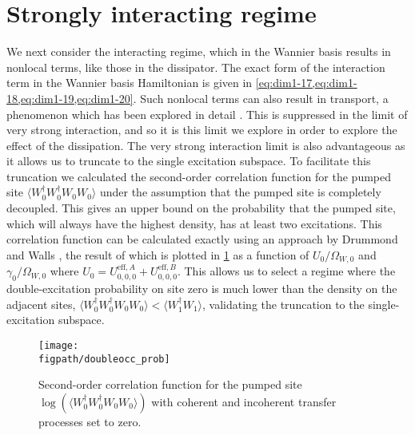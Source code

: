 \section{Strongly interacting regime}
We next consider the interacting regime, which in the Wannier basis results in nonlocal terms, like those in the dissipator. The exact form of the interaction term in the Wannier basis Hamiltonian is given in \cref{eq:dim1-17,eq:dim1-18,eq:dim1-19,eq:dim1-20}. Such nonlocal terms can also result in transport, a phenomenon which has been explored in detail \cite{Huber2010,Tovmasyan2013,Takayoshi2013,Phillips2015,Pudleiner2015}. This is suppressed in the limit of very strong interaction, and so it is this limit we explore in order to explore the effect of the dissipation. The very strong interaction limit is also advantageous as it allows us to truncate to the single excitation subspace. To facilitate this truncation we calculated the second-order correlation function for the pumped site \(\langle W_{0}^{\dagger}W_{0}^{\dagger}W_{0}W_{0} \rangle\) under the assumption that the pumped site is completely decoupled. This gives an upper bound on the probability that the pumped site, which will always have the highest density, has at least two excitations. This correlation function can be calculated exactly using an approach by Drummond and Walls \cite{Drummond1980,LeBoite2013}, the result of which is plotted in \cref{fig:dim3-1} as a function of \(U_{0}/\Omega_{W,0}\) and \(\gamma_{0}/\Omega_{W,0}\) where \(U_{0} = U_{0,0,0}^{\mathrm{eff},A} + U_{0,0,0}^{\mathrm{eff},B}\). This allows us to select a regime where the double-excitation probability on site zero is much lower than the density on the adjacent sites, \(\langle W_{0}^{\dagger}W_{0}^{\dagger}W_{0}W_{0} \rangle < \langle W_{1}^{\dagger}W_{1} \rangle\), validating the truncation to the single-excitation subspace.

\begin{figure}[ht!]
\centering 
\texttt{[image: \\figpath/doubleocc\_prob]}
\caption{\label{fig:dim3-1}Second-order correlation function for the pumped site \(\log(\langle W_{0}^{\dagger}W_{0}^{\dagger}W_{0}W_{0}\rangle )\) with coherent and incoherent transfer processes set to zero.}
\end{figure}


